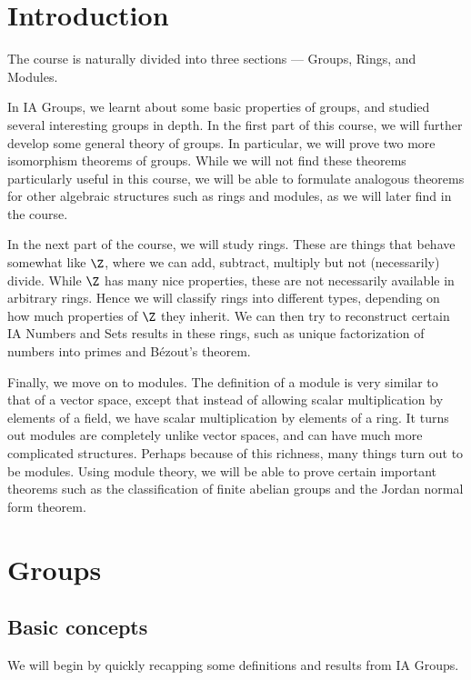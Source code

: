 \documentclass[a4paper]{article}
\begin{document}
\tableofcontents
\setcounter{section}{-1}
\section{Introduction}
The course is naturally divided into three sections --- Groups, Rings, and Modules.

In IA Groups, we learnt about some basic properties of groups, and studied several interesting groups in depth. In the first part of this course, we will further develop some general theory of groups. In particular, we will prove two more isomorphism theorems of groups. While we will not find these theorems particularly useful in this course, we will be able to formulate analogous theorems for other algebraic structures such as rings and modules, as we will later find in the course.

In the next part of the course, we will study rings. These are things that behave somewhat like $\Z$, where we can add, subtract, multiply but not (necessarily) divide. While $\Z$ has many nice properties, these are not necessarily available in arbitrary rings. Hence we will classify rings into different types, depending on how much properties of $\Z$ they inherit. We can then try to reconstruct certain IA Numbers and Sets results in these rings, such as unique factorization of numbers into primes and B\'ezout's theorem.

Finally, we move on to modules. The definition of a module is very similar to that of a vector space, except that instead of allowing scalar multiplication by elements of a field, we have scalar multiplication by elements of a ring. It turns out modules are completely unlike vector spaces, and can have much more complicated structures. Perhaps because of this richness, many things turn out to be modules. Using module theory, we will be able to prove certain important theorems such as the classification of finite abelian groups and the Jordan normal form theorem.

\section{Groups}
\subsection{Basic concepts}
We will begin by quickly recapping some definitions and results from IA Groups.
\end{document}
